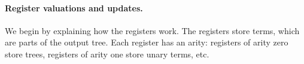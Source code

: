 


\paragraph*{Register valuations and updates.} We begin by explaining how the registers work.  The registers store terms, which are parts of the output tree. Each register has an arity: registers of arity zero  store trees, registers of arity one store unary terms, etc.  

